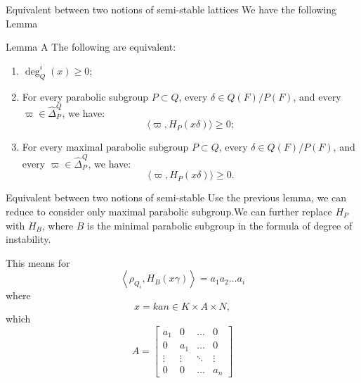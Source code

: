 \documentclass[pdf]{beamer}
\begin{document}
\begin{frame}{Equivalent between two notions of semi-stable lattices}
    We have the following Lemma
    \begin{block}{Lemma A}
        The following are equivalent:
        \begin{enumerate}
            \item \(\deg_Q^i(x) \geq 0\);
            \item For every parabolic subgroup \( P \subset Q \), every \( \delta \in Q(F)/P(F)\), and every \( \varpi \in \hat{\Delta}_P^Q \), we have:
                  \[
                      \langle \varpi, H_P(x\delta ) \rangle \geq 0;
                  \]
            \item For every maximal parabolic subgroup \( P \subset Q \), every \( \delta \in Q(F)/P(F) \), and every \( \varpi \in \hat{\Delta}_P^Q \), we have:
                  \[
                      \langle \varpi, H_P(x\delta ) \rangle \geq 0.
                  \]
        \end{enumerate}
    \end{block}
\end{frame}
\begin{frame}{Equivalent between two notions of semi-stable}
    Use the previous lemma, we can reduce to consider only maximal parabolic subgroup.We can further replace $H_P$ with $H_B$, where $B$ is the minimal parabolic subgroup in the formula of degree of instability.

    This means for
    \[\left\langle \rho_{Q_i}, H_B(x\gamma)   \right\rangle = a_1a_2\ldots a_i\]
    where
    \[x = kan \in K \times A \times N,\]
    which
    \[A = \begin{bmatrix}
            a_1    & 0      & \ldots & 0      \\
            0      & a_1    & \ldots & 0      \\
            \vdots & \vdots & \ddots & \vdots \\
            0      & 0      & \ldots & a_n
        \end{bmatrix}\]
\end{frame}
\end{document}
